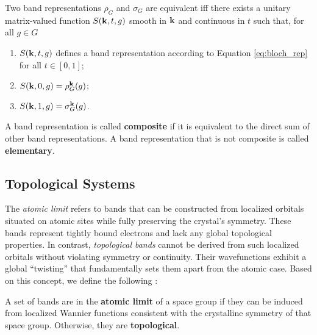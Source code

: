 \documentclass[12pt]{report}
\begin{document}
\begin{definition} \label{def:equiv_bandrep}
Two band representations $\rho_G$ and $\sigma_G$ are equivalent iff there exists a unitary matrix-valued function $S({\vb{k}},t,g)$ smooth in ${\vb{k}}$ and continuous in $t$ such that, for all $g \in G$
\begin{enumerate}
\item $S({\vb{k}}, t, g)$ defines a band representation according to Equation \ref{eq:bloch_rep} for all $t \in [0,1]$;
\item $S({\vb{k}}, 0, g) = \rho_G^{\vb{k}}(g)$;
\item $S({\vb{k}}, 1, g) = \sigma_G^{\vb{k}}(g)$.
\end{enumerate}
\end{definition}

\begin{definition}
A band representation is called \textbf{composite} if it is equivalent to the direct sum of other band representations. A band representation that is not composite is called \textbf{elementary}.
\end{definition}

\subsection{Topological Systems} \label{subsec:topological_systems}

The \textit{atomic limit} refers to bands that can be constructed from localized orbitals situated on atomic sites while fully preserving the crystal's symmetry. These bands represent tightly bound electrons and lack any global topological properties. In contrast, \textit{topological bands} cannot be derived from such localized orbitals without violating symmetry or continuity. Their wavefunctions exhibit a global ``twisting'' that fundamentally sets them apart from the atomic case. Based on this concept, we define the following \cite{building_blocks2018}:

\begin{definition}
A set of bands are in the \textbf{atomic limit} of a space group if they can be induced from localized Wannier functions consistent with the crystalline symmetry of that space group. Otherwise, they are \textbf{topological}.
\end{definition}
\end{document}
